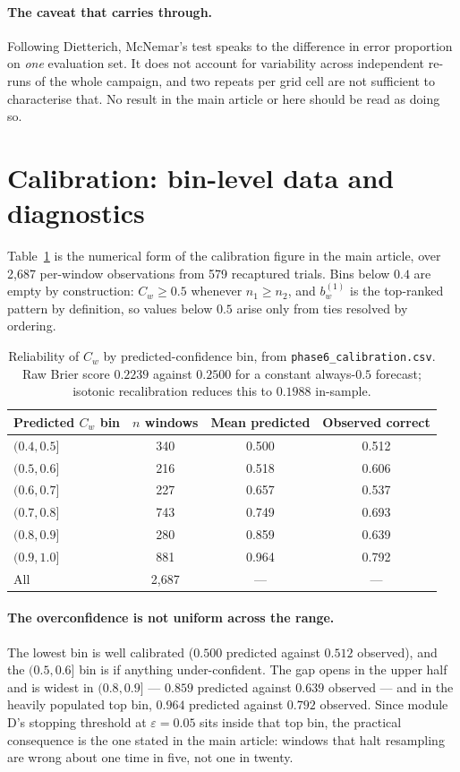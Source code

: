 \documentclass[preprint,11pt]{elsarticle}
\newcommand{\Cw}{C_w}
\begin{document}
\paragraph{The caveat that carries through.} Following Dietterich,
McNemar's test speaks to the difference in error proportion on \emph{one}
evaluation set. It does not account for variability across independent
re-runs of the whole campaign, and two repeats per grid cell are not
sufficient to characterise that. No result in the main article or here
should be read as doing so.

\section{Calibration: bin-level data and diagnostics}
\label{si:calib}

Table~\ref{tab:calib} is the numerical form of the calibration figure in
the main article, over 2{,}687 per-window observations from 579
recaptured trials. Bins below $0.4$ are empty by construction:
$\Cw\ge0.5$ whenever $n_1\ge n_2$, and $b^{(1)}_w$ is the top-ranked
pattern by definition, so values below $0.5$ arise only from ties
resolved by ordering.

\begin{table}[h]
\centering\small
\caption{Reliability of $\Cw$ by predicted-confidence bin, from
\texttt{phase6\_calibration.csv}. Raw Brier score $0.2239$ against
$0.2500$ for a constant always-$0.5$ forecast; isotonic recalibration
reduces this to $0.1988$ in-sample.}
\label{tab:calib}
\begin{tabular}{@{}lccc@{}}
\toprule
Predicted $\Cw$ bin & $n$ windows & Mean predicted & Observed correct \\
\midrule
$(0.4, 0.5]$ & 340 & 0.500 & 0.512 \\
$(0.5, 0.6]$ & 216 & 0.518 & 0.606 \\
$(0.6, 0.7]$ & 227 & 0.657 & 0.537 \\
$(0.7, 0.8]$ & 743 & 0.749 & 0.693 \\
$(0.8, 0.9]$ & 280 & 0.859 & 0.639 \\
$(0.9, 1.0]$ & 881 & 0.964 & 0.792 \\
\midrule
All          & 2{,}687 & --- & --- \\
\bottomrule
\end{tabular}
\end{table}

\paragraph{The overconfidence is not uniform across the range.} The
lowest bin is well calibrated ($0.500$ predicted against $0.512$
observed), and the $(0.5,0.6]$ bin is if anything under-confident. The
gap opens in the upper half and is widest in $(0.8,0.9]$ --- $0.859$
predicted against $0.639$ observed --- and in the heavily populated top
bin, $0.964$ predicted against $0.792$ observed. Since module D's
stopping threshold at $\varepsilon=0.05$ sits inside that top bin, the
practical consequence is the one stated in the main article: windows that
halt resampling are wrong about one time in five, not one in twenty.
\end{document}
